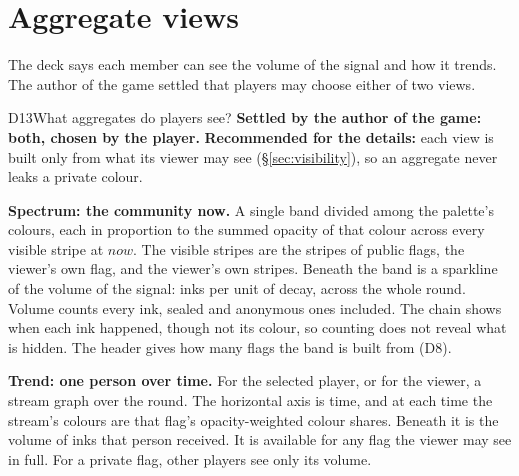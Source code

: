 \documentclass[11pt,a4paper]{article}
\begin{document}
\section{Aggregate views}\label{sec:aggregates}

The deck says each member can see the volume of the signal and how it trends. The author of the
game settled that players may choose either of two views.

\begin{decision}{D13}{What aggregates do players see?}
\textbf{Settled by the author of the game: both, chosen by the player.} \textbf{Recommended for
the details:} each view is built only from what its viewer may see (\S\ref{sec:visibility}), so
an aggregate never leaks a private colour.
\end{decision}

\textbf{Spectrum: the community now.} A single band divided among the palette's colours, each in
proportion to the summed opacity of that colour across every visible stripe at $\mathit{now}$.
The visible stripes are the stripes of public flags, the viewer's own flag, and the viewer's own
stripes. Beneath the band is a sparkline of the volume of the signal: inks per unit of decay,
across the whole round. Volume counts every ink, sealed and anonymous ones included. The chain
shows when each ink happened, though not its colour, so counting does not reveal what is hidden.
The header gives how many flags the band is built from (D8).

\textbf{Trend: one person over time.} For the selected player, or for the viewer, a stream graph
over the round. The horizontal axis is time, and at each time the stream's colours are that
flag's opacity-weighted colour shares. Beneath it is the volume of inks that person received. It
is available for any flag the viewer may see in full. For a private flag, other players see only
its volume.
\end{document}
